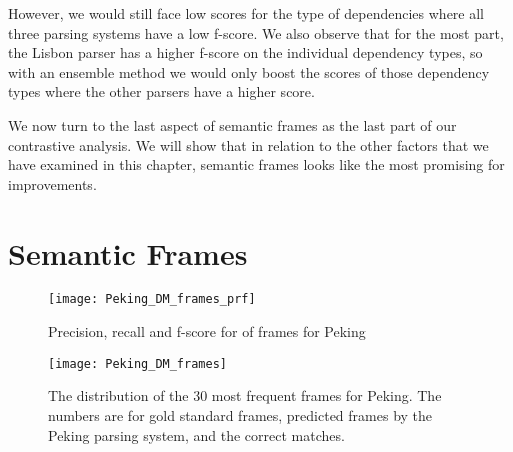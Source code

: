 However, we would still face low scores for the type of dependencies where all three parsing systems have a low f-score. We also observe that for the most part, the Lisbon parser has a higher f-score on the individual dependency types, so with an ensemble method we would only boost the scores of those dependency types where the other parsers have a higher score.

We now turn to the last aspect of semantic frames as the last part of our contrastive analysis. We will show that in relation to the other factors that we have examined in this chapter, semantic frames looks like the most promising for improvements.


















\section{Semantic Frames}

\begin{figure}[h]
    \centering
    \begin{minipage}{0.8\textwidth}
        \centering
        \texttt{[image: Peking\_DM\_frames\_prf]}
    \end{minipage}
    \caption{Precision, recall and f-score for of frames for Peking}
    \label{fig:Peking_frame_prf}
\end{figure}

\begin{figure}[h]
    \centering
    \begin{minipage}{0.8\textwidth}
        \centering
        \texttt{[image: Peking\_DM\_frames]}
    \end{minipage}
    \caption{The distribution of the 30 most frequent frames for Peking. The numbers are for gold standard frames, predicted frames by the Peking parsing system, and the correct matches.}
    \label{fig:Peking_frame_30}
\end{figure}

